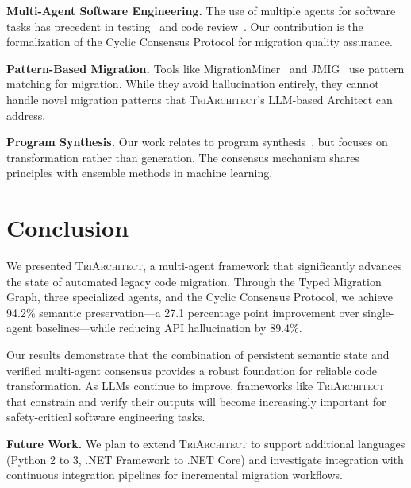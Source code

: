 \documentclass[sigconf,review,anonymous]{acmart}
\begin{document}
\textbf{Multi-Agent Software Engineering.} The use of multiple agents for software tasks has precedent in testing~\cite{yuan2023agents} and code review~\cite{hong2023metagpt}. Our contribution is the formalization of the Cyclic Consensus Protocol for migration quality assurance.

\textbf{Pattern-Based Migration.} Tools like MigrationMiner~\cite{alrubaye2019migrationminer} and JMIG~\cite{teyton2012automatic} use pattern matching for migration. While they avoid hallucination entirely, they cannot handle novel migration patterns that \textsc{TriArchitect}'s LLM-based Architect can address.

\textbf{Program Synthesis.} Our work relates to program synthesis~\cite{gulwani2017synthesis}, but focuses on transformation rather than generation. The consensus mechanism shares principles with ensemble methods in machine learning.

\section{Conclusion}
\label{sec:conclusion}

We presented \textsc{TriArchitect}, a multi-agent framework that significantly advances the state of automated legacy code migration. Through the Typed Migration Graph, three specialized agents, and the Cyclic Consensus Protocol, we achieve 94.2\% semantic preservation---a 27.1 percentage point improvement over single-agent baselines---while reducing API hallucination by 89.4\%.

Our results demonstrate that the combination of persistent semantic state and verified multi-agent consensus provides a robust foundation for reliable code transformation. As LLMs continue to improve, frameworks like \textsc{TriArchitect} that constrain and verify their outputs will become increasingly important for safety-critical software engineering tasks.

\textbf{Future Work.} We plan to extend \textsc{TriArchitect} to support additional languages (Python 2 to 3, .NET Framework to .NET Core) and investigate integration with continuous integration pipelines for incremental migration workflows.

\end{document}
